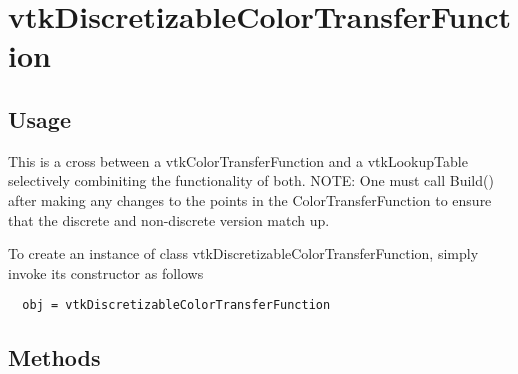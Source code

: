 \section{vtkDiscretizableColorTransferFunction}

\subsection{Usage}

 This is a cross between a vtkColorTransferFunction and a vtkLookupTable
 selectively combiniting the functionality of both.
 NOTE: One must call Build() after making any changes to the points
 in the ColorTransferFunction to ensure that the discrete and non-discrete
 version match up.

To create an instance of class vtkDiscretizableColorTransferFunction, simply
invoke its constructor as follows
\begin{verbatim}
  obj = vtkDiscretizableColorTransferFunction
\end{verbatim}
\subsection{Methods}

